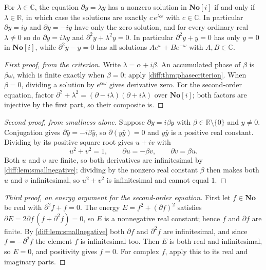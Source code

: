 \documentclass[11pt,letterpaper]{article}
\numberwithin{equation}{section}
\theoremstyle{definition}
\theoremstyle{remark}
\newcommand{\No}{\mathbf{No}}
\newcommand{\SC}{\mathbf{No}[i]}
\newcommand{\R}{\mathbb R}
\newcommand{\C}{\mathbb C}
\newcommand{\der}{\partial}
\begin{document}
\begin{corollary}
\label{diff:cor:oscillator}
For $\lambda\in\C$, the equation $\der y=\lambda y$ has a nonzero solution in
$\SC$ if and only if $\lambda\in\R$, in which case the solutions are exactly
$c\,e^{\lambda\omega}$ with $c\in\C$. In particular $\der y=iy$ and
$\der y=-iy$ have only the zero solution, and for every ordinary real
$\lambda\neq0$ so do $\der y=i\lambda y$ and $\der^{2}y+\lambda^{2}y=0$. In
particular $\der^{2}y+y=0$ has only $y=0$ in $\SC$, while $\der^{2}y-y=0$ has
all solutions $Ae^{\omega}+Be^{-\omega}$ with $A,B\in\C$.
\end{corollary}
\begin{proof}[First proof, from the criterion]
Write $\lambda=\alpha+i\beta$. An accumulated phase of $\beta$ is
$\beta\omega$, which is finite exactly when $\beta=0$; apply
\cref{diff:thm:phasecriterion}. When $\beta=0$, dividing a solution by
$e^{\alpha\omega}$ gives derivative zero. For the second-order equation,
factor $\der^{2}+\lambda^{2}=(\der-i\lambda)(\der+i\lambda)$ over $\SC$; both
factors are injective by the first part, so their composite is.
\end{proof}
\begin{proof}[Second proof, from smallness alone]
Suppose $\der y=i\beta y$ with $\beta\in\R\setminus\{0\}$ and $y\neq0$.
Conjugation gives $\der\bar y=-i\beta\bar y$, so $\der(y\bar y)=0$ and
$y\bar y$ is a positive real constant. Dividing by its positive square root
gives $u+iv$ with
\[
 u^{2}+v^{2}=1,\qquad \der u=-\beta v,\qquad \der v=\beta u .
\]
Both $u$ and $v$ are finite, so both derivatives are infinitesimal by
\cref{diff:lem:smallnegative}; dividing by the nonzero real constant $\beta$
then makes both $u$ and $v$ infinitesimal, so $u^{2}+v^{2}$ is infinitesimal
and cannot equal $1$.
\end{proof}
\begin{proof}[Third proof, an energy argument for the second-order equation]
First let $f\in\No$ be real with $\der^{2}f+f=0$. The energy
$E=f^{2}+(\der f)^{2}$ satisfies
$\der E=2\der f\,(f+\der^{2}f)=0$, so $E$ is a nonnegative real constant; hence
$f$ and $\der f$ are finite. By \cref{diff:lem:smallnegative} both $\der f$ and
$\der^{2}f$ are infinitesimal, and since $f=-\der^{2}f$ the element $f$ is
infinitesimal too. Then $E$ is both real and infinitesimal, so $E=0$, and
positivity gives $f=0$. For complex $f$, apply this to its real and imaginary
parts.
\end{proof}
\end{document}

